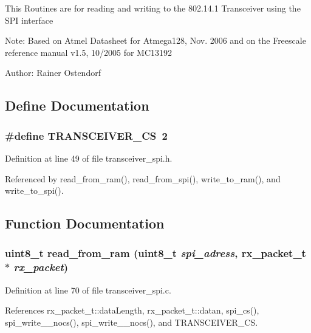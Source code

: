 This Routines are for reading and writing to the 802.14.1 Transceiver using the SPI interface

\begin{Desc}
\item[Note:]Based on Atmel Datasheet for Atmega128, Nov. 2006 and on the Freescale reference manual v1.5, 10/2005 for MC13192\end{Desc}
\begin{Desc}
\item[Author:]Rainer Ostendorf \end{Desc}


\subsection{Define Documentation}
\subsubsection{\setlength{\rightskip}{0pt plus 5cm}\#define TRANSCEIVER\_\-CS~2}\label{group__ro__transceiver__spi_g519ebaa5219cbb279c51e03a48c90f1e}




Definition at line 49 of file transceiver\_\-spi.h.

Referenced by read\_\-from\_\-ram(), read\_\-from\_\-spi(), write\_\-to\_\-ram(), and write\_\-to\_\-spi().

\subsection{Function Documentation}
\subsubsection{\setlength{\rightskip}{0pt plus 5cm}uint8\_\-t read\_\-from\_\-ram (uint8\_\-t {\em spi\_\-adress}, {\bf rx\_\-packet\_\-t} $\ast$ {\em rx\_\-packet})}\label{group__ro__transceiver__spi_gd0ae0e71ecdd034c8d3d627a28b4325c}




Definition at line 70 of file transceiver\_\-spi.c.

References rx\_\-packet\_\-t::data\-Length, rx\_\-packet\_\-t::datan, spi\_\-cs(), spi\_\-write\_\_\-nocs(), spi\_\-write\_\_\-nocs(), and TRANSCEIVER\_\-CS.

